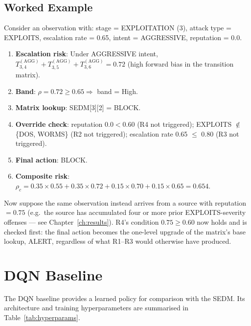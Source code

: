 \subsection{Worked Example}

Consider an observation with:
stage = EXPLOITATION (3), attack type = EXPLOITS, escalation rate = 0.65,
intent = AGGRESSIVE, reputation = 0.0.

\begin{enumerate}
  \item \textbf{Escalation risk}: Under AGGRESSIVE intent,
        $T^{(\text{AGG})}_{3,4} + T^{(\text{AGG})}_{3,5} + T^{(\text{AGG})}_{3,6} = 0.72$
        (high forward bias in the transition matrix).
  \item \textbf{Band}: $\rho = 0.72 \geq 0.65 \Rightarrow$ band = High.
  \item \textbf{Matrix lookup}: SEDM[3][2] = BLOCK.
  \item \textbf{Override check}: reputation $0.0 < 0.60$ (R4 not triggered);
        EXPLOITS $\notin$ \{DOS, WORMS\} (R2 not triggered);
        escalation rate 0.65 $\leq$ 0.80 (R3 not triggered).
  \item \textbf{Final action}: BLOCK.
  \item \textbf{Composite risk}:
        $\rho_c = 0.35 \times 0.55 + 0.35 \times 0.72 + 0.15 \times 0.70 + 0.15 \times 0.65 = 0.654$.
\end{enumerate}

Now suppose the same observation instead arrives from a source with
reputation $= 0.75$ (e.g.\ the source has accumulated four or more prior
EXPLOITS-severity offenses — see Chapter~\ref{ch:results}). R4's condition
$0.75 \geq 0.60$ now holds and is checked first: the final action becomes
the one-level upgrade of the matrix's base lookup, ALERT, regardless of what
R1--R3 would otherwise have produced.

\section{DQN Baseline}
\label{sec:dqn_baseline}

The DQN baseline provides a learned policy for comparison with the SEDM.
Its architecture and training hyperparameters are summarised in
Table~\ref{tab:hyperparams}.

